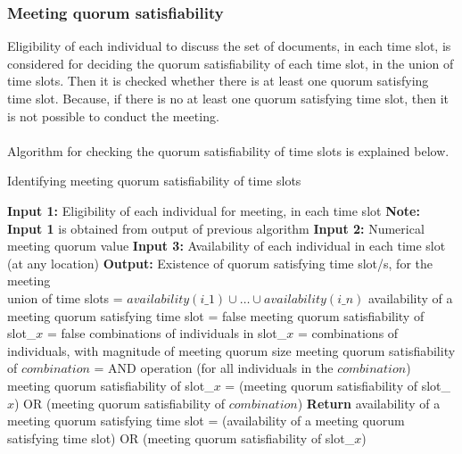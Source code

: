 \subsubsection{Meeting quorum satisfiability}
Eligibility of each individual to discuss the set of documents, in each time slot, is considered for deciding the quorum satisfiability of each time slot, in the union of time slots. Then it is checked whether there is at least one quorum satisfying time slot. Because, if there is no at least one quorum satisfying time slot, then it is not possible to conduct the meeting.\\ \\
Algorithm for checking the quorum satisfiability of time slots is explained below.
\begin{algorithm}[H]
    \caption{Identifying meeting quorum satisfiability of time slots}
    \begin{algorithmic}[1]
        \State \textbf{Input 1:} Eligibility of each individual for meeting, in each time slot
        \State \textbf{Note:} \textbf{Input 1} is obtained from output of previous algorithm
        \State \textbf{Input 2:} Numerical meeting quorum value 
        \State \textbf{Input 3:} Availability of each individual in each time slot (at any location)
        \State \textbf{Output:} Existence of quorum satisfying time slot/s, for the meeting \\
        \State union of time slots = \(availability(i\_1) \cup \dots \cup availability(i\_n)\)
        \State availability of a meeting quorum satisfying time slot = false
            \State meeting quorum satisfiability of slot\_\(x\) = false
            \State combinations of individuals in slot\_\(x\) = combinations of individuals, with magnitude of meeting quorum size 
                \State meeting quorum satisfiability of \(combination\) = AND operation (for all individuals in the \(combination\))
                \State meeting quorum satisfiability of slot\_\(x\) = (meeting quorum satisfiability of slot\_\(x\)) OR (meeting quorum satisfiability of \(combination\))
            \EndFor
            \State \textbf{Return} availability of a meeting quorum satisfying time slot = (availability of a meeting quorum satisfying time slot) OR (meeting quorum satisfiability of slot\_\(x\))
        \EndFor
    \end{algorithmic}
\end{algorithm}

